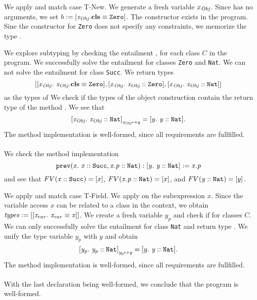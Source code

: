 \begin{example}
We apply 
and match case T-New.
We generate a fresh variable $x_{\mathit{Obj}}$.
Since  has no arguments,
we set $b := [\mathit{x_{\mathit{Obj}}}.\textbf{cls} \equiv \mathit{\texttt{Zero}}]$.
The constructor  exists in the program.
Sine the constructor for \texttt{Zero} does not specify any constraints,
we memorize the type
.

We explore subtyping by checking the entailment
\entails
  {
    ,
  }
  {}
for each class $C$ in the program.
We successfully solve the entailment for
classes \texttt{Zero} and \texttt{Nat}.
We can not solve the entailment for class \texttt{Succ}.
We return types
\[ [ \type{x_{\mIt{Obj}}}{\instBy{x_{\mIt{Obj}}}{\texttt{Zero}}},\\
     \type{x_{\mIt{Obj}}}{\instOf{x_{\mIt{Obj}}}{\texttt{Zero}}},\\
     \type{x_{\mIt{Obj}}}{\instOf{x_{\mIt{Obj}}}{\texttt{Nat}}} ] \]
as the types of 
We check if the types of the object construction contain
the return type of the method .
We see that
\[\mathit{ [x_{\mathit{Obj}}.\ \mathit{\mathit{x_{\mathit{Obj}}} :: \mathit{\texttt{Nat}}}] }_{\mathit{x_{\mathit{Obj}}} \mapsto \mathit{y}}
 = [y.\ \mathit{\mathit{y} :: \mathit{\texttt{Nat}}}]. \]
The method implementation is well-formed,
since all requirements are fullfilled.\\
\\
We check the method implementation
\[
  \mathit{\texttt{prev}}(\mathit{x}.\ \mathit{\mathit{x} :: \mathit{\texttt{Succ}}, \mathit{x.p} :: \mathit{\texttt{Nat}}}): \mathit{[y.\ \mathit{\mathit{y} :: \mathit{\texttt{Nat}}}]} := \mathit{x.p}
\]
and see that
$FV(\mathit{x} :: \mathit{\texttt{Succ}}) = [x]$,
$FV(\mathit{x.p} :: \mathit{\texttt{Nat}}) = [x]$,
and
$FV(\mathit{y} :: \mathit{\texttt{Nat}}) = [y]$.

We apply 
and match case T-Field.
We apply  on the subexpression $x$.
Since the variable access $x$ can be related to a class in the context,
we obtain $\mathit{types := [[x_{\mathit{var}}.\ \mathit{\mathit{x_{\mathit{var}}} \equiv \mathit{x}}]]}$.
We create a fresh variable $y_p$
and check if
        {}
for classes $C$.
We can only successfully solve the entailment for class \texttt{Nat}
and return type .
We unify the type variable $y_p$ with $y$ and obtain
\[ \mathit{[y_p.\ \mathit{\mathit{y_p} :: \mathit{\texttt{Nat}}}]}_{\mathit{y_p} \mapsto \mathit{y}}
    = [y.\ \mathit{\mathit{y} :: \mathit{\texttt{Nat}}}]. \]
The method implementation is well-formed,
since all requirements are fullfilled.\\
\\
With the last declaration being well-formed,
we conclude that the program is well-formed.

\end{example}

